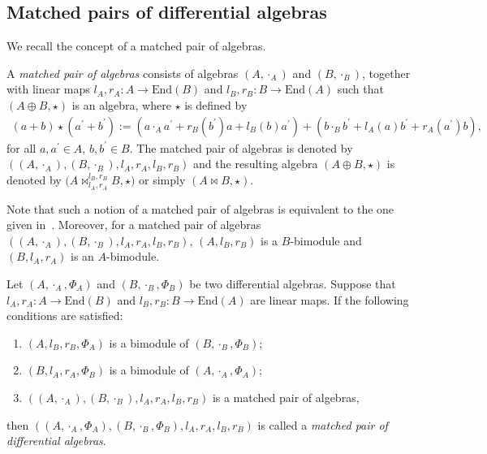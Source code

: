 \documentclass[pdftex]{sigma}
\numberwithin{equation}{section}
\newcommand{\End}{\mathrm{End}}
\begin{document}
\subsection{Matched pairs of differential algebras}\label{subsec:matched_pair}
We recall the concept of a matched pair of algebras.

\begin{Definition} A \textit{matched pair of algebras} consists of algebras $(A, \cdot_A)$ and $(B, \cdot_B)$,
 together with linear maps $l_A, r_A\colon A \to \End(B)$ and $l_B, r_B: B \to \End(A)$
 such that $(A \oplus B, \star)$ is an algebra, where $\star$ is defined by
 \begin{gather}
 (a + b) \star (a^\prime + b^\prime) := (a \cdot_A a^\prime + r_B(b^\prime)a + l_B(b)a^\prime) + (b \cdot_B b^\prime + l_A(a)b^\prime + r_A(a^\prime)b), \label{eq:multsum}
 \end{gather}
for all $a, a^\prime \in A$, $b, b^\prime \in B$. The matched pair of algebras is denoted by $((A, \cdot_A), (B, \cdot_B), l_A, r_A,\allowbreak l_B, r_B)$ and the resulting algebra $(A \oplus B, \star)$ is denoted by $\big(A \bowtie^{l_B,r_B}_{l_A,r_A} B, \star\big)$ or simply $(A \bowtie B, \star)$.
\end{Definition}

Note that such a notion of a matched pair of algebras is equivalent to the one given in~\cite[Definition~2.1.5]{BaiDouble}.
Moreover, for a matched pair of algebras $((A, \cdot_A), (B, \cdot_B), l_A, r_A, l_B, r_B)$, $(A, l_B, r_B)$ is a $B$-bimodule and $(B, l_A, r_A)$ is an $A$-bimodule.

\begin{Definition}
 Let $(A, \cdot_A, \Phi_A)$ and $(B, \cdot_B, \Phi_B)$ be two differential algebras.
 Suppose that $l_A, r_A\colon A \to \End(B)$ and $l_B, r_B\colon B \to \End(A)$ are linear maps.
 If the following conditions are satisfied:
 \begin{enumerate}\itemsep=0pt
 \item[(1)] $(A, l_B, r_B, \Phi_A)$ is a bimodule of $(B, \cdot_B, \Phi_B)$;
 \item[(2)] $(B, l_A, r_A, \Phi_B)$ is a bimodule of $(A, \cdot_A, \Phi_A)$;
 \item[(3)] $((A, \cdot_A), (B, \cdot_B), l_A, r_A, l_B, r_B)$ is a matched pair of algebras,
 \end{enumerate}
 then $((A, \cdot_A, \Phi_A), (B, \cdot_B, \Phi_B), l_A, r_A, l_B, r_B)$ is called a \textit{matched pair of differential algebras}.
\end{Definition}
\end{document}

